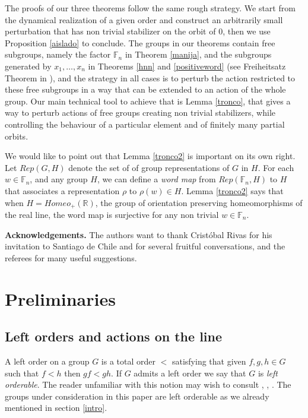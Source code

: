 \documentclass[12pt]{article}
\newcommand{\F}{\mathbb{F}}
\newcommand{\R}{\mathbb{R}}
\theoremstyle{definition}
\newcommand{\vs}{\vspace{0.3cm}}
\begin{document}
The proofs of our three theorems follow the same rough strategy. We start from the dynamical realization of a given order and construct an arbitrarily small perturbation that has non trivial stabilizer on the orbit of 0, then we use Proposition \ref{aislado} to conclude. The groups in our theorems contain free subgroups, namely the factor $\F_n$ in Theorem \ref{manija}, and the subgroups generated by $x_1,\ldots,x_n$ in Theorems \ref{hnn} and \ref{positiveword} (see Freiheitsatz Theorem in \cite{Baumslag}), and the strategy in all cases is to perturb the action restricted to these free subgroups in a way that can be extended to an action of the whole group. Our main technical tool to achieve that is Lemma \ref{tronco}, that gives a way to perturb actions of free groups creating non trivial stabilizers, while controlling the behaviour of a particular element and of finitely many partial orbits.  

We would like to point out that Lemma \ref{tronco2} is important on its own right. Let $Rep(G,H)$ denote the set of of group representations of $G$ in $H$.  For each $w\in\F_n$, and any group $H$, we can define a  {\em word map} from  $Rep(\F_n,H)$ to $H$ that associates a representation $\rho$ to $\rho(w)\in H$. Lemma \ref{tronco2} says that when $H=Homeo_{+}(\R)$, the group of orientation preserving homeomorphisms of the real line, the word map is surjective for any non trivial $w\in\F_n$.
\vs

{\bf Acknowledgements.} The authors want to thank Crist\'obal Rivas for his invitation to Santiago de Chile and for several fruitful conversations, and the referees for many useful suggestions. 


\section{Preliminaries}



\subsection{Left orders and actions on the line}\label{preliminaresordenes}

A left order on a group $G$ is a total order $<$ satisfying  that given $f,g,h\in G$ such that $f < h $ then $ gf < gh$. If $G$ admits a left order we say that $G$ is {\em left orderable}. The reader unfamiliar with this notion may wish to consult \cite{clay rolfsen}, \cite{GOD}, \cite{KM}. The groups under consideration in this paper are left orderable as we already mentioned in section \ref{intro}.
\end{document}
